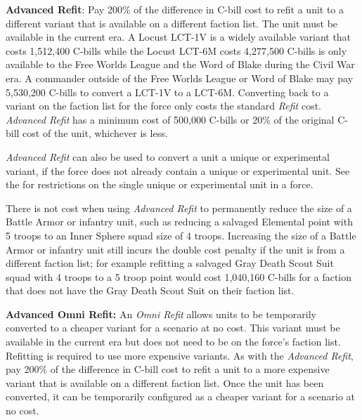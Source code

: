 \item {\bfseries Advanced Refit}: Pay 200\% of the difference in C-bill cost to refit a unit to a different variant that is available on a different faction list.
The unit must be available in the current era.
A Locust LCT-1V is a widely available variant that costs 1,512,400 C-bills while the Locust LCT-6M costs 4,277,500 C-bills is only available to the Free Worlds League and the Word of Blake during the Civil War era.
A commander outside of the Free Worlds League or Word of Blake may pay 5,530,200 C-bills to convert a LCT-1V to a LCT-6M.
Converting back to a variant on the faction list for the force only costs the standard \emph{Refit} cost.
\emph{Advanced Refit} has a minimum cost of 500,000 C-bills or 20\% of the original C-bill cost of the unit, whichever is less.

\emph{Advanced Refit} can also be used to convert a unit a unique or experimental variant, if the force does not already contain a unique or experimental unit.
See the  for restrictions on the single unique or experimental unit in a force.

There is not cost when using \emph{Advanced Refit} to permanently reduce the size of a Battle Armor or infantry unit, such as reducing a salvaged Elemental point with 5 troops to an Inner Sphere squad size of 4 troops.
Increasing the size of a Battle Armor or infantry unit still incurs the double cost penalty if the unit is from a different faction list; for example refitting a salvaged Gray Death Scout Suit squad with 4 troops to a 5 troop point would cost 1,040,160 C-bills for a faction that does not have the Gray Death Scout Suit on their faction list.

\item {\bfseries Advanced Omni Refit:} An \emph{Omni Refit} allows units to be temporarily converted to a cheaper variant for a scenario at no cost.
This variant must be available in the current era but does not need to be on the force's faction list.
Refitting is required to use more expensive variants.
As with the \emph{Advanced Refit}, pay 200\% of the difference in C-bill cost to refit a unit to a more expensive variant that is available on a different faction list.
Once the unit has been converted, it can be temporarily configured as a cheaper variant for a scenario at no cost.
